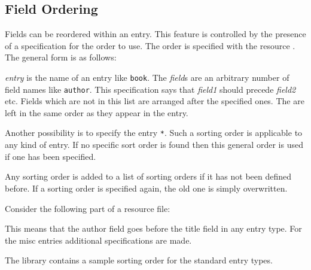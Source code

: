 \documentclass[11pt,a4paper]{scrbook}
\begin{document}
\subsection{Field Ordering}

Fields can be reordered within an entry. This feature is controlled by the
presence of a specification for the order to use. The order is specified with
the resource . The general form is as follows:

\begin{Resources}
\end{Resources}

\emph{entry} is the name of an entry like \texttt{book}. The \emph{field}s are
an arbitrary number of field names like \texttt{author}. This specification
says that \emph{field1} should precede \emph{field2} etc. Fields which are not
in this list are arranged after the specified ones. The are left in the same
order as they appear in the entry.

Another possibility is to specify the entry \texttt{*}. Such a sorting order
is applicable to any kind of entry. If no specific sort order is found then
this general order is used if one has been specified.

Any sorting order is added to a list of sorting orders if it has not been
defined before. If a sorting order is specified again, the old one is simply
overwritten.

Consider the following part of a resource file:

\begin{Resources}
\end{Resources}

This means that the author field goes before the title field in any entry
type. For the misc entries additional specifications are made.

The library  contains a sample sorting order for the
standard entry types.


\begin{Summary}
\end{Summary}
\end{document}

